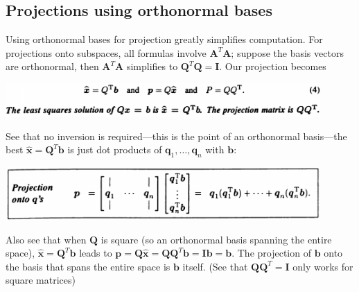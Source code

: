 \documentclass{report}
\begin{document}
\subsection{Projections using orthonormal bases}
Using orthonormal bases for projection greatly simplifies computation. For 
projections onto subspaces, all formulas involve $\bm A^T\bm A$; suppose the basis vectors are orthonormal, then $\bm A^T\bm A$ simplifies to $\bm Q^T\bm Q=\bm I$. Our 
projection becomes
\begin{center}
\includegraphics[width=12cm]{85}
\end{center}
See that no inversion is required---this is the point of an orthonormal basis---the best $\hat{\bm x}=\bm Q^T\bm b$ is just dot products of $\bm q_1,\ldots,\bm q_n$ with 
$\bm b$:
\begin{center}
\includegraphics[width=12cm]{86}
\end{center}
Also see that when $\bm Q$ is square (so an orthonormal basis spanning the entire space), $\hat{\bm x}=\bm Q^T\bm b$ leads to $\bm p=\bm Q\hat{\bm x}=\bm Q\bm Q^T\bm b=
\bm I\bm b=\bm b$. The projection of $\bm b$ onto the basis that spans the entire space
is $\bm b$ itself. (See that $\bm{QQ}^T=\bm I$ only works for square matrices)
\newpage
\end{document}
